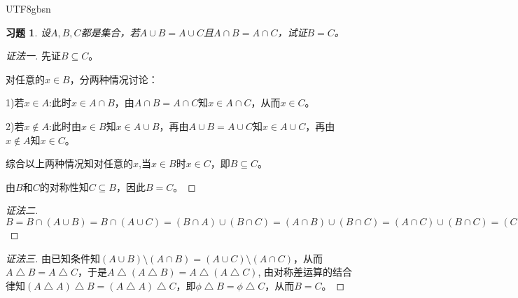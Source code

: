 \documentclass{article}
\begin{document}
\begin{CJK}{UTF8}{gbsn}
\newtheorem*{Ex}{习题}
  \begin{Ex}
      设$A,B,C$都是集合，若$A\cup B = A\cup C$且$A\cap B = A\cap C$，试证$B=C$。
\end{Ex}
\begin{proof}[证法一]
  先证$B\subseteq C$。

  对任意的$x \in B$，分两种情况讨论：

  1)若$x \in A$:此时$x \in A\cap B$，由$A\cap B = A\cap C$知$x \in A\cap C$，从而$x \in C$。

  2)若$x \notin A$:此时由$x\in B$知$x\in A\cup B$，再由$A\cup B = A\cup C$知$x \in A\cup C$，再由$x \notin A$知$x \in C$。

  综合以上两种情况知对任意的$x$,当$x\in B$时$x\in C$，即$B \subseteq C$。
  

  由$B$和$C$的对称性知$C \subseteq B$，因此$B=C$。
\end{proof}

\begin{proof}[证法二]
  $B= B\cap (A\cup B) = B \cap (A \cup C) = (B \cap A) \cup (B \cap C) = (A \cap B) \cup (B \cap C) = (A \cap C) \cup (B \cap C) = (C \cap A) \cup (C \cap B) = C \cap (A \cup B) = C \cap (A \cup C) = C$
  
\end{proof}

\begin{proof}[证法三]
由已知条件知$(A\cup B)\setminus (A\cap B) = (A\cup C)\setminus (A\cap C)$，从而$A\bigtriangleup B = A \bigtriangleup C$，于是$A \bigtriangleup (A\bigtriangleup B) =A \bigtriangleup (A \bigtriangleup C)$, 由对称差运算的结合律知$(A \bigtriangleup A)\bigtriangleup B =(A \bigtriangleup A) \bigtriangleup C$，即$\phi \bigtriangleup B = \phi \bigtriangleup C$，从而$B = C$。
\end{proof}
\end{CJK}
\end{document}
